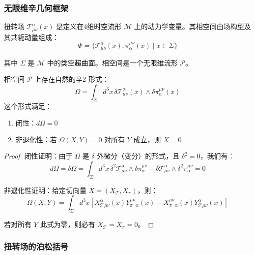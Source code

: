 \subsubsection{无限维辛几何框架}

扭转场 $\mathcal{T}^\alpha_{\mu\nu}(x)$ 是定义在4维时空流形 $\mathcal{M}$ 上的动力学变量。其相空间由场构型及其共轭动量组成：
\begin{equation}
    \Phi = \{\mathcal{T}^\alpha_{\mu\nu}(x), \pi_\alpha^{\mu\nu}(x) \mid x \in \Sigma\}
\end{equation}

其中 $\Sigma$ 是 $\mathcal{M}$ 中的类空超曲面。相空间是一个无限维流形 $\mathcal{P}$。

\begin{theorem}[相空间辛结构]
相空间 $\mathcal{P}$ 上存在自然的辛2-形式：
\begin{equation}
    \Omega = \int_\Sigma d^3x \, \delta\mathcal{T}^\alpha_{\mu\nu}(x) \wedge \delta\pi_\alpha^{\mu\nu}(x)
\end{equation}
这个形式满足：
\begin{enumerate}
    \item 闭性：$d\Omega = 0$
    \item 非退化性：若 $\Omega(X, Y) = 0$ 对所有 $Y$ 成立，则 $X = 0$
\end{enumerate}
\end{theorem}

\begin{proof}
闭性证明：由于 $\Omega$ 是 $\delta$ 外微分（变分）的形式，且 $\delta^2 = 0$，我们有：
\begin{equation}
    d\Omega = \delta\Omega = \int_\Sigma d^3x \, \delta^2\mathcal{T}^\alpha_{\mu\nu} \wedge \delta\pi_\alpha^{\mu\nu} - \delta\mathcal{T}^\alpha_{\mu\nu} \wedge \delta^2\pi_\alpha^{\mu\nu} = 0
\end{equation}

非退化性证明：给定切向量 $X = (X_\mathcal{T}, X_\pi)$，则：
\begin{equation}
    \Omega(X, Y) = \int_\Sigma d^3x \left[ X_\mathcal{T}^\alpha_{\mu\nu}(x) Y_\pi^{\mu\nu}_\alpha(x) - X_\pi^{\mu\nu}_\alpha(x) Y_\mathcal{T}^\alpha_{\mu\nu}(x) \right]
\end{equation}

若对所有 $Y$ 此式为零，则必有 $X_\mathcal{T} = X_\pi = 0$。
\end{proof}

\subsubsection{扭转场的泊松括号}

